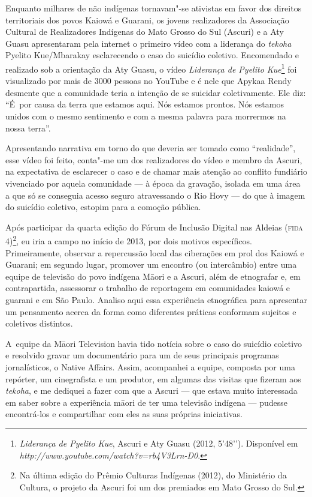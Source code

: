 Enquanto milhares de não indígenas tornavam"-se ativistas em favor dos
direitos territoriais dos povos Kaiowá e Guarani, os jovens
realizadores da Associação Cultural de Realizadores Indígenas do Mato
Grosso do Sul (Ascuri) e a Aty Guasu apresentaram pela internet o
primeiro vídeo com a liderança do \emph{tekoha} Pyelito Kue/Mbarakay
esclarecendo o caso do suicídio coletivo. Encomendado e realizado sob a
orientação da Aty Guasu, o vídeo \emph{Liderança de Pyelito
Kue}\footnote[5]{\emph{Liderança de Pyelito Kue}, Ascuri e Aty Guasu (2012,
5’48’’). Disponível em \emph{http://www.youtube.com/watch?v=rb4V3Lrn-D0}.} foi
visualizado por mais de 3000 pessoas no YouTube e é nele que Apykaa
Rendy desmente que a comunidade teria a intenção de se suicidar
coletivamente. Ele diz: ``É~por causa da terra que estamos aqui. Nós
estamos prontos. Nós estamos unidos com o mesmo sentimento e com a
mesma palavra para morrermos na nossa terra''.

Apresentando narrativa em torno do que deveria ser tomado como
``realidade'', esse vídeo foi feito, conta"-me um dos realizadores do
vídeo e membro da Ascuri, na expectativa de esclarecer o caso e de
chamar mais atenção ao conflito fundiário vivenciado por aquela
comunidade --- à época da gravação, isolada em uma área a que só se
conseguia acesso seguro atravessando o Rio Hovy --- do que à imagem do
suicídio coletivo, estopim para a comoção pública.

Após participar da quarta edição do Fórum de Inclusão Digital nas
Aldeias (\textsc{fida} 4)\footnote[6]{Na última edição do Prêmio Culturas Indígenas
(2012), do Ministério da Cultura, o projeto da Ascuri foi um dos
premiados em Mato Grosso do Sul.}, eu iria a campo no início de 2013,
por dois motivos específicos. Primeiramente, observar a repercussão
local das ciberações em prol dos Kaiowá e Guarani; em segundo lugar,
promover um encontro (ou intercâmbio) entre uma equipe de televisão do
povo indígena M\=aori e a Ascuri, além de etnografar e, em
contrapartida, assessorar o trabalho de reportagem em comunidades
kaiowá e guarani e em São Paulo. Analiso aqui essa experiência
etnográfica para apresentar um pensamento acerca da forma como
diferentes práticas conformam sujeitos e coletivos distintos.

A~equipe da M\=aori Television havia tido notícia sobre o caso do
suicídio coletivo e resolvido gravar um documentário para um de seus
principais programas jornalísticos, o Native Affairs. Assim, acompanhei
a equipe, composta por uma repórter, um cinegrafista e um produtor, em
algumas das visitas que fizeram aos \emph{tekoha}, e me dediquei a fazer com
que a Ascuri --- que estava muito interessada em saber sobre a
experiência m\=aori de ter uma televisão indígena --- pudesse
encontrá-los e compartilhar com eles as suas próprias iniciativas.

